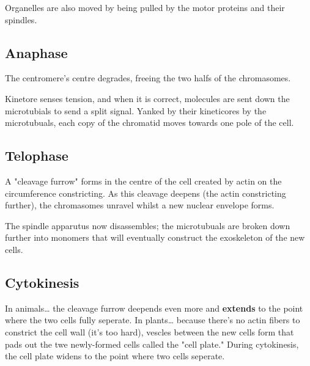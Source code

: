\documentclass[letterpaper]{article}
\begin{document}
Organelles are also moved by being pulled by the motor proteins and
their spindles.

\subsection{Anaphase}
\label{sec:orgdc95aab}
The centromere's centre degrades, freeing the two halfs of the
chromasomes.

Kinetore senses tension, and when it is correct, molecules are sent down
the microtubials to send a split signal. Yanked by their kineticores by
the microtubuals, each copy of the chromatid moves towards one pole of
the cell.

\subsection{Telophase}
\label{sec:orge45b10b}
A "cleavage furrow" forms in the centre of the cell created by actin on
the circumference constricting. As this cleavage deepens (the actin
constricting further), the chromasomes unravel whilst a new nuclear
envelope forms.

The spindle apparutus now disassembles; the microtubuals are broken down
further into monomers that will eventually construct the exoskeleton of
the new cells.

\subsection{Cytokinesis}
\label{sec:orgd700bfa}
In animals\ldots{} the cleavage furrow deepends even more and \textbf{extends} to
the point where the two cells fully seperate. In plants\ldots{} because
there's no actin fibers to constrict the cell wall (it's too hard),
vescles between the new cells form that pads out the twe newly-formed
cells called the "cell plate." During cytokinesis, the cell plate widens
to the point where two cells seperate.
\end{document}
